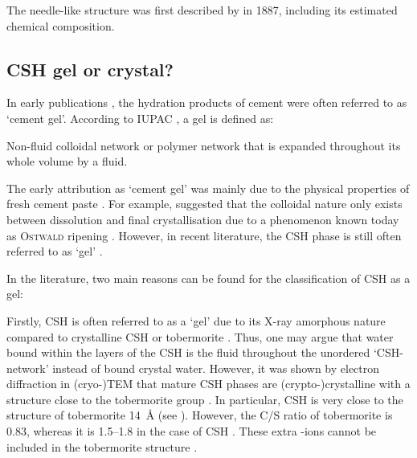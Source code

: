 The needle-like structure was first described by \textcite{lechatelier.1887} in 1887, including its estimated chemical composition.

\subsection{\acs*{CSH} gel or crystal?}

In early publications \cite{lea.1937,powers.1958}, the hydration products of cement were often referred to as `cement gel'.
According to \textsc{IUPAC} \cite{gold.2019}, a gel is defined as:
\begin{iquote}
    Non-fluid colloidal network or polymer network that is expanded throughout its whole volume by a fluid.
\end{iquote}

The early attribution as `cement gel' was mainly due to the physical properties of fresh cement paste \cite{lea.1937}.
For example, \textcite{baykoff.1926} suggested that the colloidal nature only exists between dissolution and final crystallisation due to a phenomenon known today as \textsc{Ostwald} ripening \cite{ostwald.1897}.
However, in recent literature, the \ac{CSH} phase is still often referred to as `gel' \cite{masoero.2018, walkley.2019, duque-redondo.2022}. %

In the literature, two main reasons can be found for the classification of \ac{CSH} as a gel:

Firstly, \ac{CSH} is often referred to as a `gel' due to its X-ray amorphous nature compared to crystalline \ac{CSH} or tobermorite \cite{jennings.1981, garbev.2004}.
Thus, one may argue that water bound within the layers of the \ac{CSH} is the fluid throughout the unordered `\ac{CSH}-network' instead of bound crystal water.
However, it was shown by electron diffraction in (cryo-)\ac{TEM} that mature \ac{CSH} phases are (crypto-)crystalline \cite{kurczyk.1960, grudemo.1960, grudemo.1965, melzer.1989, rossler.2006} with a structure close to the tobermorite group \cite{grudemo.1960,kurczyk.1960,biagioni.2015}.
In particular, \ac{CSH} is very close to the structure of tobermorite \qty{14}{\angstrom} \cite{bonaccorsi.2005} (see ).
However, the C/S ratio of tobermorite is \num{0.83}, whereas it is \numrange{1.5}{1.8} in the case of \ac{CSH} \cite{bonaccorsi.2005, rossler.2006}.
These extra -ions cannot be included in the tobermorite structure \cite{rossler.2006}.


